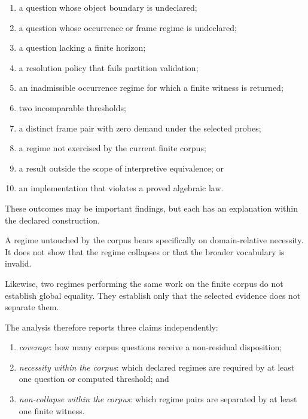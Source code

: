 \documentclass[11pt]{article}
\theoremstyle{plain}
\theoremstyle{definition}
\theoremstyle{remark}
\begin{document}
\begin{enumerate}[label=(N\arabic*)]
  \item a question whose object boundary is undeclared;
  \item a question whose occurrence
        or frame regime is undeclared;
  \item a question lacking a finite horizon;
  \item a resolution policy
        that fails partition validation;
  \item an inadmissible occurrence regime
        for which a finite witness is returned;
  \item two incomparable thresholds;
  \item a distinct frame pair
        with zero demand under the selected probes;
  \item a regime not exercised
        by the current finite corpus;
  \item a result outside the scope
        of interpretive equivalence; or
  \item an implementation that violates
        a proved algebraic law.
\end{enumerate}

These outcomes may be important findings,
but each has an explanation
within the declared construction.

A regime untouched by the corpus
bears specifically on domain-relative necessity.
It does not show that the regime collapses
or that the broader vocabulary is invalid.

Likewise,
two regimes performing the same work
on the finite corpus
do not establish global equality.
They establish only
that the selected evidence
does not separate them.

The analysis therefore reports
three claims independently:

\begin{enumerate}[label=(\alph*)]
  \item \emph{coverage}:
        how many corpus questions
        receive a non-residual disposition;

  \item \emph{necessity within the corpus}:
        which declared regimes
        are required by at least one question
        or computed threshold; and

  \item \emph{non-collapse within the corpus}:
        which regime pairs
        are separated by at least one finite witness.
\end{enumerate}
\end{document}

